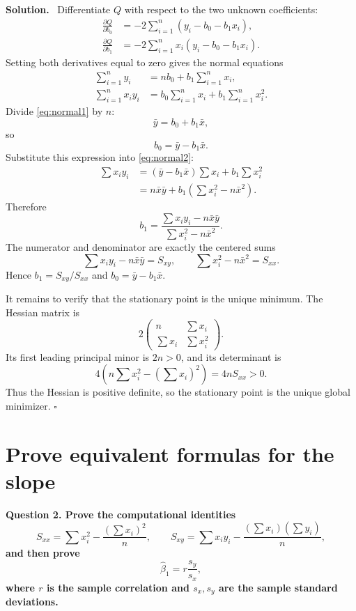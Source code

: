 \documentclass[11pt]{article}
\newcommand{\Sxx}{S_{xx}}
\newcommand{\Sxy}{S_{xy}}
\newcommand{\bone}{\widehat{\beta}_1}
\newenvironment{question}
  {\par\medskip\noindent\color{navy}\bfseries}
  {\par\medskip\color{black}}
\newenvironment{solution}
  {\noindent\color{darkgreen}\textbf{Solution.}\color{black}\ }
  {\hfill$\square$\par\medskip}
\begin{document}
\begin{solution}
Differentiate $Q$ with respect to the two unknown coefficients:
\begin{align*}
\frac{\partial Q}{\partial b_0}
  &=-2\sum_{i=1}^n(y_i-b_0-b_1x_i),\\
\frac{\partial Q}{\partial b_1}
  &=-2\sum_{i=1}^n x_i(y_i-b_0-b_1x_i).
\end{align*}
Setting both derivatives equal to zero gives the normal equations
\begin{align}
  \sum_{i=1}^n y_i&=nb_0+b_1\sum_{i=1}^n x_i, \label{eq:normal1}\\
  \sum_{i=1}^n x_i y_i&=b_0\sum_{i=1}^n x_i+b_1\sum_{i=1}^n x_i^2. \label{eq:normal2}
\end{align}
Divide \eqref{eq:normal1} by $n$:
\[
  \bar y=b_0+b_1\bar x,
\]
so
\[
  b_0=\bar y-b_1\bar x.
\]
Substitute this expression into \eqref{eq:normal2}:
\begin{align*}
\sum x_i y_i
  &=(\bar y-b_1\bar x)\sum x_i+b_1\sum x_i^2\\
  &=n\bar x\bar y+b_1\left(\sum x_i^2-n\bar x^2\right).
\end{align*}
Therefore
\[
 b_1=
 \frac{\sum x_i y_i-n\bar x\bar y}
      {\sum x_i^2-n\bar x^2}.
\]
The numerator and denominator are exactly the centered sums
\[
\sum x_i y_i-n\bar x\bar y=\Sxy,
\qquad
\sum x_i^2-n\bar x^2=\Sxx.
\]
Hence $b_1=\Sxy/\Sxx$ and $b_0=\bar y-b_1\bar x$.

It remains to verify that the stationary point is the unique minimum. The
Hessian matrix is
\[
  2\begin{pmatrix}
      n & \sum x_i\\
      \sum x_i & \sum x_i^2
    \end{pmatrix}.
\]
Its first leading principal minor is $2n>0$, and its determinant is
\[
  4\left(n\sum x_i^2-\left(\sum x_i\right)^2\right)
  =4n\Sxx>0.
\]
Thus the Hessian is positive definite, so the stationary point is the unique
global minimizer.
\end{solution}

\section{Prove equivalent formulas for the slope}

\begin{question}
Question 2. Prove the computational identities
\[
\Sxx=\sum x_i^2-\frac{(\sum x_i)^2}{n},
\qquad
\Sxy=\sum x_iy_i-\frac{(\sum x_i)(\sum y_i)}{n},
\]
and then prove
\[
  \boxed{\bone=r\frac{s_y}{s_x}},
\]
where $r$ is the sample correlation and $s_x,s_y$ are the sample standard
deviations.
\end{question}
\end{document}
